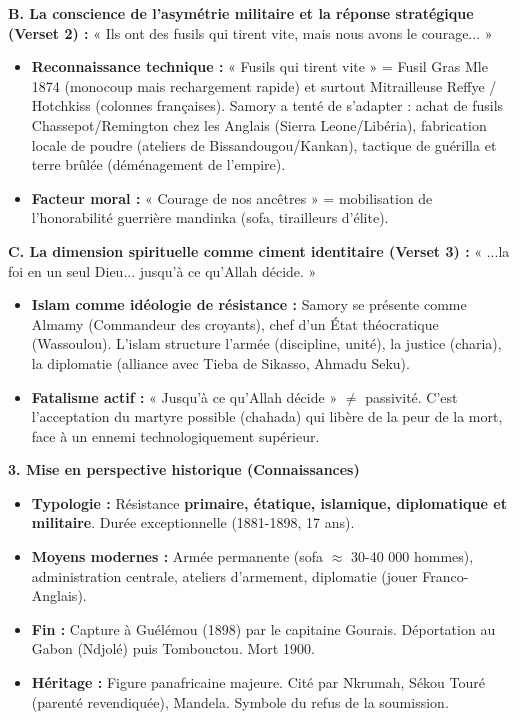 \documentclass[11pt]{article}
\newcommand{\cle}[1]{{\popxbold\color{popdark}#1}}
\begin{document}
\begin{exoresolu}
\textbf{B. La conscience de l'asymétrie militaire et la réponse stratégique (Verset 2) :} « Ils ont des fusils qui tirent vite, mais nous avons le courage... »
\begin{itemize}
    \item \textbf{Reconnaissance technique :} « Fusils qui tirent vite » = \cle{Fusil Gras Mle 1874} (monocoup mais rechargement rapide) et surtout \cle{Mitrailleuse Reffye / Hotchkiss} (colonnes françaises). Samory a tenté de s'adapter : achat de fusils \cle{Chassepot/Remington} chez les Anglais (Sierra Leone/Libéria), fabrication locale de poudre (\cle{ateliers de Bissandougou/Kankan}), tactique de \cle{guérilla} et \cle{terre brûlée} (déménagement de l'empire).
    \item \textbf{Facteur moral :} « Courage de nos ancêtres » = mobilisation de l'\cle{honorabilité guerrière mandinka} (sofa, tirailleurs d'élite).
\end{itemize}

\textbf{C. La dimension spirituelle comme ciment identitaire (Verset 3) :} « ...la foi en un seul Dieu... jusqu'à ce qu'Allah décide. »
\begin{itemize}
    \item \textbf{Islam comme idéologie de résistance :} Samory se présente comme \cle{Almamy} (Commandeur des croyants), chef d'un \cle{État théocratique} (Wassoulou). L'islam structure l'armée (discipline, unité), la justice (charia), la diplomatie (alliance avec Tieba de Sikasso, Ahmadu Seku).
    \item \textbf{Fatalisme actif :} « Jusqu'à ce qu'Allah décide » $\neq$ passivité. C'est l'acceptation du martyre possible (\cle{chahada}) qui libère de la peur de la mort, face à un ennemi technologiquement supérieur.
\end{itemize}

\textbf{3. Mise en perspective historique (Connaissances)}
\begin{itemize}
    \item \textbf{Typologie :} Résistance \textbf{primaire, étatique, islamique, diplomatique et militaire}. Durée exceptionnelle (1881-1898, 17 ans).
    \item \textbf{Moyens modernes :} Armée permanente (\cle{sofa} $\approx$ 30-40 000 hommes), administration centrale, ateliers d'armement, diplomatie (jouer Franco-Anglais).
    \item \textbf{Fin :} Capture à \cle{Guélémou} (1898) par le capitaine \cle{Gourais}. Déportation au Gabon (Ndjolé) puis Tombouctou. Mort 1900.
    \item \textbf{Héritage :} Figure panafricaine majeure. Cité par \cle{Nkrumah}, \cle{Sékou Touré} (parenté revendiquée), \cle{Mandela}. Symbole du \cle{refus de la soumission}.
\end{itemize}


\end{exoresolu}
\end{document}
